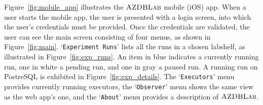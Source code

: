 \documentclass{vldb}
\def\azdb{\hbox{\sc AZDBLab}}
\begin{document}
Figure~\ref{fig:mobile_app} illustrates the $\azdb$ mobile (iOS) app. \linebreak
When a user starts the mobile app, the user is presented with a login screen, into which the user's credentials must be provided. 
Once the credentials are validated, the user can see the main screen consisting of four menus, as shown in \hbox{Figure}~\ref{fig:main}. 
`{\tt Experiment Runs}' lists all the runs in a \hbox{chosen} labshelf, as illustrated in \hbox{Figure}~\ref{fig:exp_runs}. 
An item in blue \hbox{indicates} a currently running run, one in white a \hbox{pending} run, and one in gray a paused run. 
A running run on \hbox{PostreSQL} is exhibited in Figure~\ref{fig:exp_details}.
The `{\tt Executors}' menu provides currently running \hbox{executors}, the `{\tt Observer}' menu shows 
the same view as the web app's one, and the `{\tt About}' menu provides a description of $\azdb$. 


\end{document}
